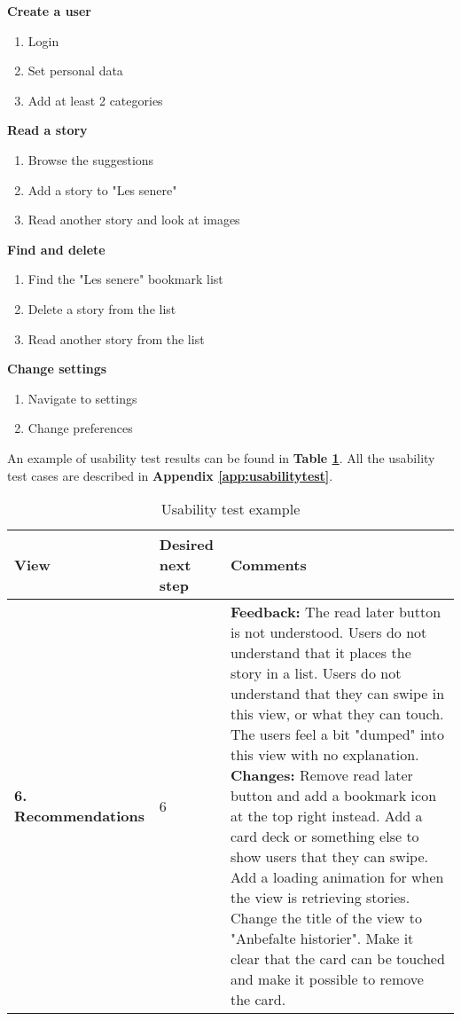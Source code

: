 \textbf{Create a user} 	
	\begin{enumerate}
		\item Login 
		\item Set personal data 
		\item Add at least 2 categories 
	\end{enumerate}
\textbf{Read a story} 
	\begin{enumerate}
		\item Browse the suggestions 
		\item Add a story to "Les senere" 
		\item Read another story and look at images 
	\end{enumerate}
\textbf{Find and delete }
	\begin{enumerate}
		\item Find the "Les senere" bookmark list
		\item Delete a story from the list
		\item Read another story from the list 
	\end{enumerate}
 \textbf{Change settings}
	\begin{enumerate}
		\item Navigate to settings 
		\item Change preferences 
	\end{enumerate}
	


An example of usability test results can be found in \textbf{Table \ref{Tab:usabilityTestexample}}. All the usability test cases are described in \textbf{Appendix \ref{app:usabilitytest}}.

\begin{table}[H]
\begin{center}
	\caption{Usability test example }
	\label{Tab:usabilityTestexample}
	\begin{tabular}{ | p{2cm} | p{2cm} | p{13cm}|}	
		\hline
		\textbf{View} & \textbf{Desired next step} & \textbf{Comments}
		\\ \hline
		
		\textbf{6. Recommendations} & 6 & 
		\textbf{Feedback:} The read later button is not understood. Users do not understand that it places the story in a list. Users do not understand that they can swipe in this view, or what they can touch. The users feel a bit "dumped" into this view with no explanation.\newline
		\textbf{Changes:} Remove read later button and add a bookmark icon at the top right instead. Add a card deck or something else to show users that they can swipe. Add a loading animation for when the view is retrieving stories. Change the title of the view to "Anbefalte historier". Make it clear that the card can be touched and make it possible to remove the card.
		\\\hline
	\end{tabular}
\end{center}
\end{table}
	

